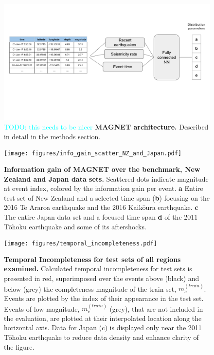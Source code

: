 \documentclass[pdflatex]{sn-jnl}
\newcommand{\neri}[1]{{\textcolor{cyan}{#1}}}
\begin{document}
\newpage
\begin{figure}[h!]
    \centering
    \includegraphics[width=1\textwidth]{figures/detailed_architecture.pdf}
    \caption{\neri{TODO: this needs to be nicer} \textbf{MAGNET architecture.} Described in detail in the methods section.}
    \label{fig:architecture}
\end{figure}

\newpage
\begin{figure}[h!]
	\centering
        \texttt{[image: figures/info\_gain\_scatter\_NZ\_and\_Japan.pdf]}
	\caption{
            \textbf{Information gain of MAGNET over the benchmark, New Zealand and Japan data sets.} Scattered dots indicate magnitude at event index, colored by the information gain per event. \textbf{a} Entire test set of New Zealand and a selected time span (\textbf{b}) focusing on the 2016 Te Araroa earthquake and the 2016 Kaikōura earthquake. \textbf{c} The entire Japan data set and a focused time span \textbf{d} of the 2011 Tōhoku earthquake and some of its aftershocks.
         }
\label{fig:nz_japan_info_gain}
\end{figure}

\newpage
\begin{figure}[h!]
    \centering
        \texttt{[image: figures/temporal\_incompleteness.pdf]}
    \caption{
    \textbf{Temporal Incompleteness for test sets of all regions examined.} Calculated temporal incompleteness for test sets is presented in red, superimposed over the events above (black) and below (grey) the completeness magnitude of the train set, $m_c^{(train)}$. Events are plotted by the index of their appearance in the test set. Events of low magnitude, $m_c^{(train)}$ (grey), that are not included in the evaluation, are plotted at their interpolated location along the horizontal axis. Data for Japan (c) is displayed only near the 2011 Tōhoku earthquake to reduce data density and enhance clarity of the figure.
    }
    \label{fig:temp_incompleteness}
\end{figure}
\end{document}
